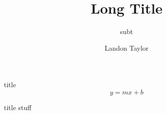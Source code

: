 \documentclass[aspectratio=169,12pt,xcolor={dvipsnames}]{beamer}
\title[ShortTitle]{Long Title}
\subtitle{subt}
\author{Landon Taylor}
\institute{Utah State University}
\date{}
\begin{document}
	\maketitle
	
	\begin{frame}{title}
		\begin{equation}
			y = mx + b
		\end{equation}
	\end{frame}

	\begin{frame}{title}
		stuff
	\end{frame}
	
\end{document}
